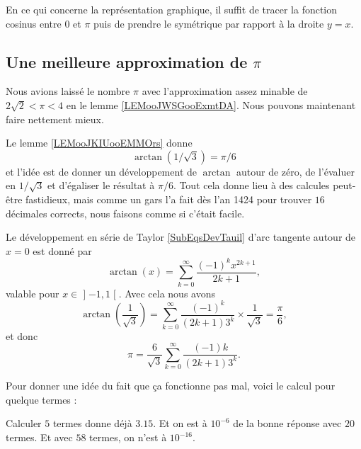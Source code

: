 En ce qui concerne la représentation graphique, il suffit de tracer la fonction cosinus entre \( 0\) et \( \pi\) puis de prendre le symétrique par rapport à la droite \( y=x\).

\begin{center}
    
\end{center}

\subsection{Une meilleure approximation de \( \pi\)}

Nous avions laissé le nombre \( \pi\) avec l'approximation assez minable de \( 2\sqrt{ 2 }<\pi<4\) en le lemme \ref{LEMooJWSGooExmtDA}. Nous pouvons maintenant faire nettement mieux.

Le lemme \ref{LEMooJKIUooEMMOrs} donne
\begin{equation}
    \arctan(1/\sqrt{ 3 })=\pi/6
\end{equation}
et l'idée est de donner un développement de \( \arctan\) autour de zéro, de l'évaluer en \( 1/\sqrt{ 3 }\) et d'égaliser le résultat à \( \pi/6\). Tout cela donne lieu à des calcules peut-être fastidieux, mais comme un gars l'a fait dès l'an 1424\cite{ooOMUNooGROVUu} pour trouver \( 16\) décimales corrects, nous faisons comme si c'était facile.

Le développement en série de Taylor \ref{SubEqsDevTauil} d'arc tangente autour de \( x=0\) est donné par
\begin{equation}
    \arctan(x)=\sum_{k=0}^{\infty}\frac{ (-1)^{k}x^{2k+1} }{ 2k+1 },
\end{equation}
valable pour \( x\in \mathopen] -1 , 1 \mathclose[\). Avec cela nous avons
\begin{equation}
    \arctan(\frac{1}{ \sqrt{ 3 } })=\sum_{k=0}^{\infty}\frac{ (-1)^k }{ (2k+1)3^k }\times \frac{1}{ \sqrt{ 3 } }=\frac{ \pi }{ 6 },
\end{equation}
et donc
\begin{equation}
    \pi=\frac{ 6 }{ \sqrt{ 3 } }\sum_{k=0}^{\infty}\frac{ (-1)k }{ (2k+1)3^k }.
\end{equation}

Pour donner une idée du fait que ça fonctionne pas mal, voici le calcul pour quelque termes :

Calculer \( 5\) termes donne déjà \( 3.15\). Et on est à \( 10^{-6}\) de la bonne réponse avec \( 20\) termes. Et avec $58$ termes, on n'est à \( 10^{-16}\).

